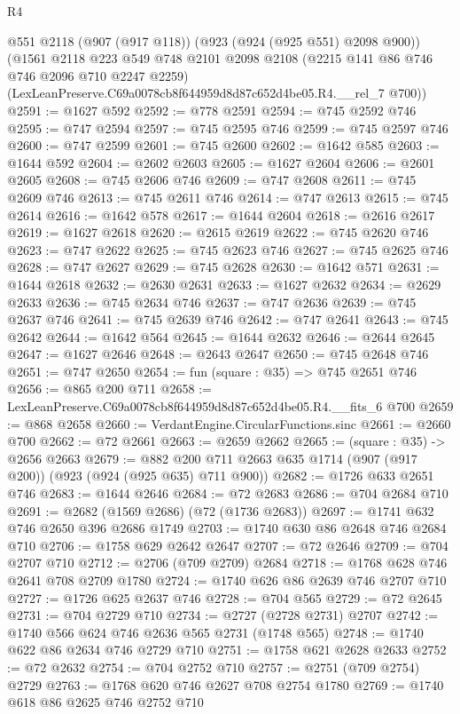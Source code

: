 \begin{lexlean}{R4}
\begin{coremodule}
    @551
    @2118
    (@907 (@917 @118))
    (@923 (@924 (@925 @551) @2098 @900))
    (@1561
      @2118
      @223
      @549
      @748
      @2101
      @2098
      @2108
      (@2215 @141 @86 @746 @746 @2096 @710 @2247 @2259)
      (LexLeanPreserve.C69a0078cb8f644959d8d87c652d4be05.R4.__rel_7 @700))
@2591 := @1627 @592
@2592 := @778 @2591
@2594 := @745 @2592 @746
@2595 := @747 @2594
@2597 := @745 @2595 @746
@2599 := @745 @2597 @746
@2600 := @747 @2599
@2601 := @745 @2600
@2602 := @1642 @585
@2603 := @1644 @592
@2604 := @2602 @2603
@2605 := @1627 @2604
@2606 := @2601 @2605
@2608 := @745 @2606 @746
@2609 := @747 @2608
@2611 := @745 @2609 @746
@2613 := @745 @2611 @746
@2614 := @747 @2613
@2615 := @745 @2614
@2616 := @1642 @578
@2617 := @1644 @2604
@2618 := @2616 @2617
@2619 := @1627 @2618
@2620 := @2615 @2619
@2622 := @745 @2620 @746
@2623 := @747 @2622
@2625 := @745 @2623 @746
@2627 := @745 @2625 @746
@2628 := @747 @2627
@2629 := @745 @2628
@2630 := @1642 @571
@2631 := @1644 @2618
@2632 := @2630 @2631
@2633 := @1627 @2632
@2634 := @2629 @2633
@2636 := @745 @2634 @746
@2637 := @747 @2636
@2639 := @745 @2637 @746
@2641 := @745 @2639 @746
@2642 := @747 @2641
@2643 := @745 @2642
@2644 := @1642 @564
@2645 := @1644 @2632
@2646 := @2644 @2645
@2647 := @1627 @2646
@2648 := @2643 @2647
@2650 := @745 @2648 @746
@2651 := @747 @2650
@2654 := fun (square : @35) => @745 @2651 @746
@2656 := @865 @200 @711
@2658 := LexLeanPreserve.C69a0078cb8f644959d8d87c652d4be05.R4.__fits_6 @700
@2659 := @868 @2658
@2660 := VerdantEngine.CircularFunctions.sinc
@2661 := @2660 @700
@2662 := @72 @2661
@2663 := @2659 @2662
@2665 := (square : @35) -> @2656 @2663
@2679 := @882 @200 @711 @2663 @635 @1714 (@907 (@917 @200)) (@923 (@924 (@925 @635) @711 @900))
@2682 := @1726 @633 @2651 @746
@2683 := @1644 @2646
@2684 := @72 @2683
@2686 := @704 @2684 @710
@2691 := @2682 (@1569 @2686) (@72 (@1736 @2683))
@2697 := @1741 @632 @746 @2650 @396 @2686 @1749
@2703 := @1740 @630 @86 @2648 @746 @2684 @710
@2706 := @1758 @629 @2642 @2647
@2707 := @72 @2646
@2709 := @704 @2707 @710
@2712 := @2706 (@709 @2709) @2684
@2718 := @1768 @628 @746 @2641 @708 @2709 @1780
@2724 := @1740 @626 @86 @2639 @746 @2707 @710
@2727 := @1726 @625 @2637 @746
@2728 := @704 @565
@2729 := @72 @2645
@2731 := @704 @2729 @710
@2734 := @2727 (@2728 @2731) @2707
@2742 := @1740 @566 @624 @746 @2636 @565 @2731 (@1748 @565)
@2748 := @1740 @622 @86 @2634 @746 @2729 @710
@2751 := @1758 @621 @2628 @2633
@2752 := @72 @2632
@2754 := @704 @2752 @710
@2757 := @2751 (@709 @2754) @2729
@2763 := @1768 @620 @746 @2627 @708 @2754 @1780
@2769 := @1740 @618 @86 @2625 @746 @2752 @710

\end{coremodule}
\end{lexlean}

